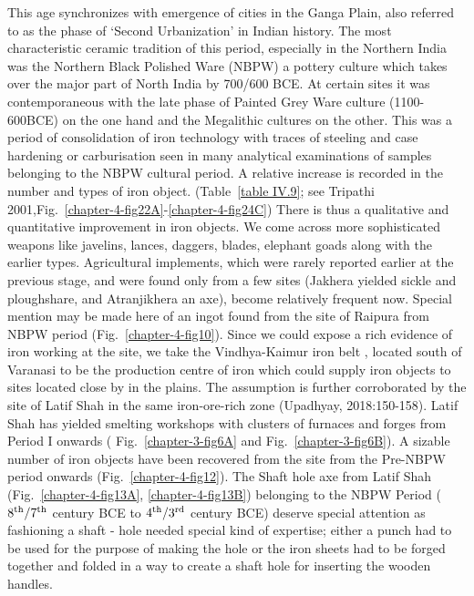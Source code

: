 This age synchronizes with emergence of cities in the Ganga Plain, also referred to as the phase of ‘Second Urbanization’ in Indian history. The most characteristic ceramic tradition of this period, especially in the Northern India was the Northern Black Polished Ware (NBPW) a pottery culture which takes over the major part of North India by 700/600 BCE. At certain sites it was contemporaneous with the late phase of Painted Grey Ware culture (1100-600BCE) on the one hand and the Megalithic cultures on the other. This was a period of consolidation of iron technology with traces of steeling and case hardening or carburisation seen in many analytical examinations of samples belonging to the NBPW cultural period. A relative increase is recorded in the number and types of iron object. (Table~\ref{table IV.9}; see Tripathi 2001,Fig.~\ref{chapter-4-fig22A}-\ref{chapter-4-fig24C}) There is thus a qualitative and quantitative improvement in iron objects. We come across more sophisticated weapons like javelins, lances, daggers, blades, elephant goads along with the earlier types. Agricultural implements, which were rarely reported earlier at the previous stage, and were found only from a few sites (Jakhera yielded sickle and ploughshare, and Atranjikhera an axe), become relatively frequent now. Special mention may be made here of an ingot found from the site of Raipura from NBPW period (Fig.~\ref{chapter-4-fig10}). Since we could expose a rich evidence of iron working at the site, we take the Vindhya-Kaimur iron belt , located south of Varanasi to be the production centre of iron which could supply iron objects to sites located close by in the plains. The assumption is further corroborated by the site of Latif Shah in the same iron-ore-rich zone (Upadhyay, 2018:150-158). Latif  Shah  has yielded smelting workshops with clusters of furnaces and forges from Period I onwards ( Fig.~\ref{chapter-3-fig6A} and  Fig.~\ref{chapter-3-fig6B}). A sizable number of iron objects have been recovered from the site from the Pre-NBPW period onwards (Fig.~\ref{chapter-4-fig12}). The Shaft hole axe from Latif Shah (Fig.~\ref{chapter-4-fig13A}, \ref{chapter-4-fig13B}) belonging to the NBPW Period ($8^{\rm th}/7^{\rm th}$ century BCE to $4^{\rm th}/3^{\rm rd}$ century BCE) deserve special attention as fashioning a shaft - hole needed special kind of expertise; either a punch had to be used for the purpose of making the hole or the iron sheets had to be forged together and folded in a way to create a shaft hole for inserting the wooden handles. 

